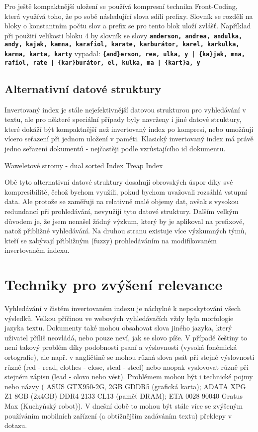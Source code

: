 \documentclass[12pt,letterpaper,oneside,openright]{book}
\newcommand{\bftt}[1]{\texttt{\textbf{#1}}}
\begin{document}
Pro ještě kompaktnější uložení se používá kompresní technika Front-Coding,
která využívá toho, že po sobě následující slova sdílí prefixy. Slovník se
rozdělí na bloky o konstantním počtu slov a prefix se pro tento blok uloží
zvlášť. Například při použití velikosti bloku 4 by slovník se slovy
\bftt{anderson, andrea, andulka, andy, kajak, kamna, karafiol, karate,
karburátor, karel, karkulka, karma, karta, karty} vypadal:
\bftt{\{and\}erson, rea, ulka, y | \{ka\}jak, mna, rafiol, rate | \{kar\}burátor, el, kulka, ma | \{kart\}a, y}


\subsection{Alternativní datové struktury}
Invertovaný index je stále nejefektivnější datovou strukturou pro vyhledávání v
textu, ale pro některé speciální případy byly navrženy i jiné datové struktury,
které dokáží být kompaktnější než invertovaný index po kompresi, nebo umožňují
vícero seřazení při jednom uložení v paměti. Klasický invertovaný index má
právě jedno seřazení dokumentů - nejčastěji podle vzrůstajícího id dokumentu.

Waweletové stromy - dual sorted Index Treap Index

Obě tyto alternativní datové struktury dosahují obrovských úspor díky
své kompresibilitě, čehož bychom využili, pokud bychom uvažovali
rozsáhlá vstupní data. Ale protože se zaměřuji na relativně malé objemy
dat, avšak s vysokou redundancí při prohledávání, nevyužiji tyto datové
struktury. Dalším velkým důvodem je, že jsem nenašel žádný výzkum, který
by je aplikoval na prefixové, natož přibližné vyhledávání. Na druhou
stranu existuje více výzkumných týmů, kteří se zabývají přibližným
(fuzzy) prohledáváním na modifikovaném invertovaném indexu.

\section{Techniky pro zvýšení relevance}
Vyhledávání v čistém invertovaném indexu je náchylné k neposkytování všech
výsledků. Velkou příčinou ve webových vyhledávačích vždy byla morfologie jazyka
textu. Dokumenty také mohou obsahovat slova jiného jazyka, který uživatel
příliš neovládá, nebo pouze neví, jak se slovo píše. V případě češtiny to není
takový problém díky podobnosti psaní a výslovnosti (vysoká fonémická
ortografie), ale např. v angličtině se mohou různá slova psát při stejné
výslovnosti různě (red - read, clothes - close, steal - steel) nebo naopak
vyslovovat různě při stejném zápisu (lead - olovo nebo vést). Problémem mohou
být i technické pojmy nebo názvy ( ASUS GTX950-2G, 2GB GDDR5 (grafická karta);
ADATA XPG Z1 8GB (2x4GB) DDR4 2133 CL13 (paměť DRAM); ETA 0028 90040 Gratus Max
(Kuchyňský robot)). V dnešní době to mohou být stále více se zvýšeným
používáním mobilních zařízení (a obtížnějším zadáváním textu) překlepy v
dotazu.
\end{document}
